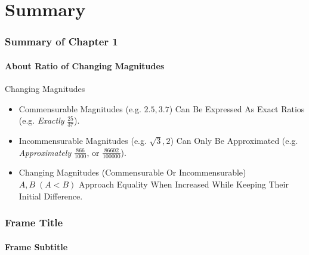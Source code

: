 \documentclass{beamer}
\begin{document}
\section*{Summary}
\begin{frame}
\frametitle{Summary of Chapter 1}
\framesubtitle{About Ratio of Changing Magnitudes}
\label{slide:summarych1}
\begin{block}{Changing Magnitudes}
\begin{itemize}
\pause
\item Commensurable Magnitudes (e.g. $2.5, 3.7$) Can Be Expressed As \alert{Exact Ratios} (e.g. \textit{Exactly} $\frac{25}{37}$).
\pause
\item Incommensurable Magnitudes (e.g. $\sqrt{3}, 2$) Can Only Be Approximated (e.g. \textit{Approximately} $\frac{866}{1000}$, or $\frac{86602}{100000}$).
\pause
\item Changing Magnitudes (\alert{Commensurable Or Incommensurable}) $A, B\;(A<B)$ Approach Equality When Increased While Keeping Their Initial Difference.
\end{itemize}
\end{block}
\end{frame}
\begin{frame}
\frametitle{Frame Title}
\framesubtitle{Frame Subtitle}
\label{slide:slidelabel}
\end{frame}
\end{document}
